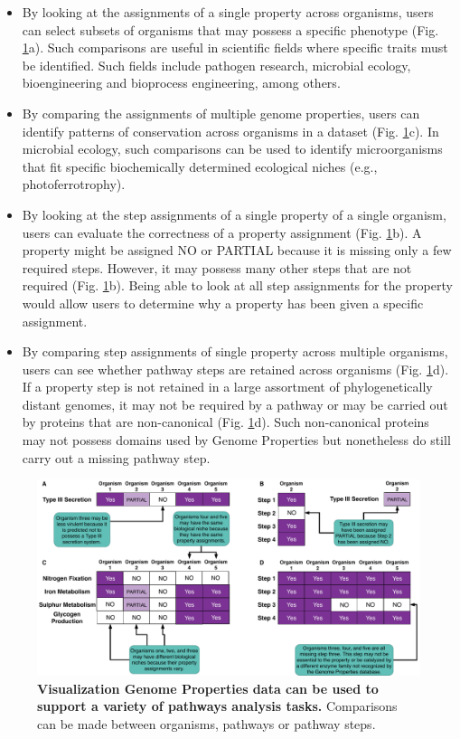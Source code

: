 \begin{itemize}
\item By looking at the assignments of a single property across organisms, users can select subsets of organisms that may possess a specific phenotype (Fig. \ref{fig:client-analysis-types}a). Such comparisons are useful in scientific fields where specific traits must be identified. Such fields include pathogen research, microbial ecology, bioengineering and bioprocess engineering, among others.
\item By comparing the assignments of multiple genome properties, users can identify patterns of conservation across organisms in a dataset (Fig. \ref{fig:client-analysis-types}c). In microbial ecology, such comparisons can be used to identify microorganisms that fit specific biochemically determined ecological niches (e.g., photoferrotrophy).
\item By looking at the step assignments of a single property of a single organism, users can evaluate the correctness of a property assignment (Fig. \ref{fig:client-analysis-types}b). A property might be assigned NO or PARTIAL because it is missing only a few required steps. However, it may possess many other steps that are not required (Fig. \ref{fig:client-analysis-types}b). Being able to look at all step assignments for the property would allow users to determine why a property has been given a specific assignment.
\item By comparing step assignments of single property across multiple organisms, users can see whether pathway steps are retained across organisms (Fig. \ref{fig:client-analysis-types}d). If a property step is not retained in a large assortment of phylogenetically distant genomes, it may not be required by a pathway or may be carried out by proteins that are non-canonical (Fig. \ref{fig:client-analysis-types}d). Such non-canonical proteins may not possess domains used by Genome Properties but nonetheless do still carry out a missing pathway step.
\end{itemize}

\begin{figure}[!ht]
  \centering
	\includegraphics[width=\textwidth]{media/analysis_types.pdf}
	 \caption[Visualization Genome Properties data can be used to support a variety of pathways analysis tasks.]{\textbf{Visualization Genome Properties data can be used to support a variety of pathways analysis tasks.} Comparisons can be made between organisms, pathways or pathway steps.}
	 \label{fig:client-analysis-types}
\end{figure}

